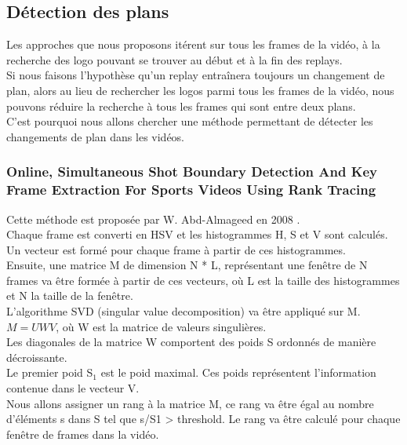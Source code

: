 \documentclass[11pt]{article}
\begin{document}
\subsection{Détection des plans}
\label{sec:org4c34a84}
Les approches que nous proposons itérent sur tous les frames de la vidéo, à la recherche des logo pouvant se trouver au début et à la fin des replays.\\
Si nous faisons l'hypothèse qu'un replay entraînera toujours un changement de plan, alors au lieu de rechercher les logos parmi tous les frames de la vidéo, nous pouvons réduire la recherche à tous les frames qui sont entre deux plans.\\

C'est pourquoi nous allons chercher une méthode permettant de détecter les changements de plan dans les vidéos.\\

\subsubsection{Online, Simultaneous Shot Boundary Detection And Key Frame Extraction For Sports Videos Using Rank Tracing}
\label{sec:org43d60dc}
Cette méthode est proposée par W. Abd-Almageed en 2008 \cite{Abd_Almageed_2008}.\\

Chaque frame est converti en HSV et les histogrammes H, S et V sont calculés.\\
Un vecteur est formé pour chaque frame à partir de ces histogrammes.\\
Ensuite, une matrice M de dimension N * L, représentant une fenêtre de N frames va être formée à partir de ces vecteurs, où L est la taille des histogrammes et N la taille de la fenêtre.\\

L'algorithme SVD (singular value decomposition) va être appliqué sur M.  \(M = UWV\), où W est la matrice de valeurs singulières.\\

Les diagonales de la matrice W comportent des poids S ordonnés de manière décroissante.\\
Le premier poid S\(_{\text{1}}\) est le poid maximal. Ces poids représentent l'information contenue dans le vecteur V.\\

Nous allons assigner un rang à la matrice M,  ce rang va être égal au nombre d'éléments s dans S tel que s/S1 > threshold. Le rang va être calculé pour chaque fenêtre de frames dans la vidéo.\\
\end{document}
